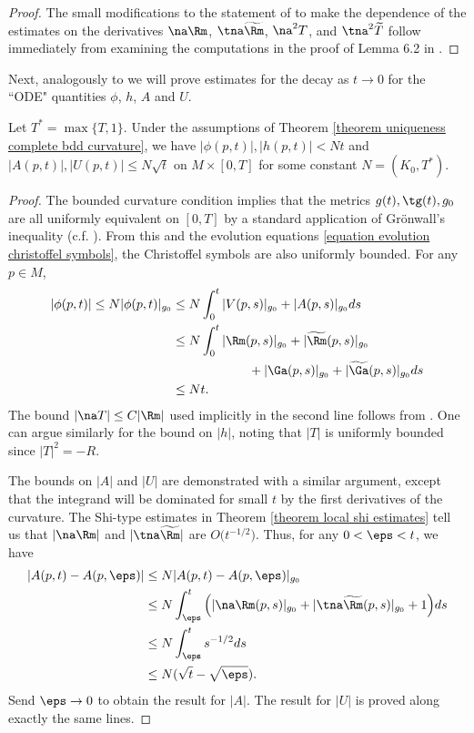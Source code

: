 \documentclass[hidelinks, 12pt, oneside, reqno]{amsart}
\begin{document}
\begin{proof}
    The small modifications to the statement of \cite[Lemma 6.2]{LotayWeiLaplacianFlow} to make the dependence of the estimates on the derivatives $\na \Rm$, $\tna \widetilde \Rm$, $\na^2 T$, and $\tna^2 \widetilde T$ follow immediately from examining the computations in the proof of Lemma 6.2 in \cite{LotayWeiLaplacianFlow}. 
\end{proof}

Next, analogously to \cite[Lemma 6]{kotschwarEnergy} we will prove estimates for the decay as $t \rightarrow 0$ for the ``ODE" quantities $\phi$, $h$, $A$ and $U$.

\begin{lem}
Let $T^* = \max\{T,1\}$. Under the assumptions of Theorem \ref{theorem uniqueness complete bdd curvature}, we have $|\phi(p,t)|, |h(p,t)| < Nt$ and $|A(p,t)|, |U(p,t)| \le N \sqrt {t}$ on $M \times [0, T]$ for some constant $N = (K_0, T^*)$. 
\end{lem}

\begin{proof}
    The bounded curvature condition implies that the metrics $g(t), \tg(t), g_0$ are all uniformly equivalent on $[0,T]$ by a standard application of Gr\"onwall's inequality (c.f. \cite{ShiDeforming}). From this and the evolution equations \eqref{equation evolution christoffel symbols}, the Christoffel symbols are also uniformly bounded. For any $p \in M$,
    \begin{align*}
        |\phi(p,t)| \le N|\phi(p,t)|_{g_0} &\le N \int_0^t |V(p,s)|_{g_0} + |A(p,s)|_{g_0} ds \\
        &\le N \int_0^t |\Rm (p,s)|_{g_0} + |\widetilde \Rm (p,s)|_{g_0} \\
        &\qquad \qquad \qquad + | \Ga (p,s)|_{g_0} + | \widetilde \Ga (p,s)|_{g_0} ds\\
        &\le Nt.
    \end{align*}
    The bound $|\na T| \le C |\Rm|$ used implicitly in the second line follows from \cite[Proposition 2.4]{LotayWeiLaplacianFlow}. One can argue similarly for the bound on $|h|$, noting that $|T|$ is uniformly bounded since $|T|^2 = -R$. 

    The bounds on $|A|$ and $|U|$ are demonstrated with a similar argument, except that the integrand will be dominated for small $t$ by the first derivatives of the curvature. The Shi-type estimates in Theorem \ref{theorem local shi estimates} tell us that $|\na \Rm|$ and $|\tna \widetilde \Rm|$ are $O\big(t^{-1/2}\big)$. Thus, for any $0 < \eps < t$, we have
    \begin{align*}
        |A(p,t) - A(p, \eps)| &\le N|A(p,t) - A(p, \eps)|_{g_0} \\
        &\le N \int_{\eps}^t \Big( |\na \Rm(p,s)|_{g_0} + |\tna \widetilde \Rm(p,s)|_{g_0} + 1 \Big) ds \\
        &\le N \int_{\eps}^t s^{-1/2} ds\\
        &\le N(\sqrt{t} - \sqrt{\eps}). 
    \end{align*}
Send $\eps \rightarrow 0$ to obtain the result for $|A|$. The result for $|U|$ is proved along exactly the same lines.
\end{proof}
\end{document}
